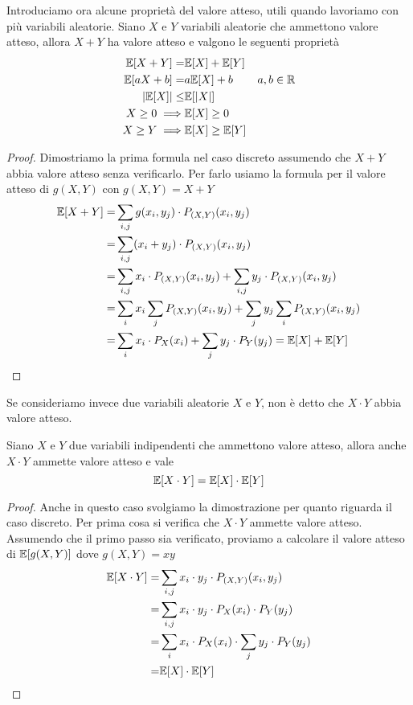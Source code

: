 Introduciamo ora alcune proprietà del valore atteso, utili quando lavoriamo con più variabili
aleatorie. Siano $X$ e $Y$ variabili aleatorie che ammettono valore atteso, allora $X+Y$ ha valore
atteso e valgono le seguenti proprietà
\begin{align*}
	\mathbb{E}[X+Y] =         & \mathbb{E}[X] + \mathbb{E}[Y]                 \\
	\mathbb{E}[aX + b] =      & a \mathbb{E}[X] + b      & a,b \in \mathbb{R} \\
	|\mathbb{E}[X]| \leq      & \mathbb{E}[|X|]                       \\
	X \geq 0 \implies & \mathbb{E}[X] \geq 0                  \\
	X \geq Y \implies & \mathbb{E}[X] \geq \mathbb{E}[Y]
\end{align*}
\begin{proof}
	Dimostriamo la prima formula nel caso discreto assumendo che $X+Y$ abbia valore atteso
	senza verificarlo. Per farlo usiamo la formula per il valore atteso di $g(X,Y)$ con
	$g(X,Y) = X+Y$
	\begin{align*}
		\mathbb{E}[X+Y] = & \sum_{i,j} g(x_i, y_j) \cdot P_{(X, Y)} (x_i, y_j)                    \\
		=         & \sum_{i,j} (x_i + y_j) \cdot P_{(X,Y)} (x_i, y_j)                     \\
		=         & \sum_{i,j} x_i \cdot P_{(X,Y)} (x_i, y_j) +
		\sum_{i,j} y_j \cdot P_{(X,Y)} (x_i, y_j)                                         \\
		=         & \sum_i x_i \sum_j P_{(X,Y)} (x_i, y_j) +
		\sum_j y_j \sum_i P_{(X,Y)} (x_i, y_j)                                            \\
		=         & \sum_i x_i \cdot P_X(x_i) + \sum_j y_j \cdot P_Y(y_j) = \mathbb{E}[X] + \mathbb{E}[Y]
	\end{align*}
\end{proof}

Se consideriamo invece due variabili aleatorie $X$ e $Y$, non è detto che $X \cdot Y$ abbia valore
atteso.

\begin{proposition}
	Siano $X$ e $Y$ due variabili indipendenti che ammettono valore atteso, allora anche $X\cdot Y$
	ammette valore atteso e vale
	\[ \mathbb{E}[X \cdot Y] = \mathbb{E}[X] \cdot \mathbb{E}[Y] \]
	\begin{proof}
		Anche in questo caso svolgiamo la dimostrazione per quanto riguarda il caso discreto. Per
		prima cosa si verifica che $X \cdot Y$ ammette valore atteso. Assumendo che il primo passo
		sia verificato, proviamo a calcolare il valore atteso di $\mathbb{E}[g(X,Y)]$ dove $g(X,Y)=xy$
		\begin{align*}
			\mathbb{E}[X \cdot Y] = & \sum_{i,j} x_i \cdot y_j \cdot P_{(X,Y)} (x_i, y_j)        \\
			=               & \sum_{i,j} x_i \cdot y_j \cdot P_X(x_i) \cdot P_Y(y_j)     \\
			=               & \sum_i x_i \cdot P_X (x_i) \cdot \sum_j y_j \cdot P_Y(y_j) \\
			=               & \mathbb{E}[X] \cdot \mathbb{E}[Y]
		\end{align*}
	\end{proof}
\end{proposition}

